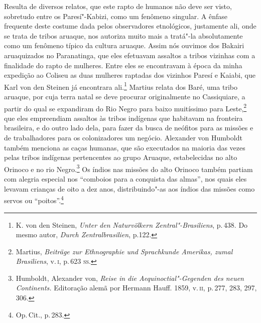 
Resulta de diversos relatos, que este rapto de humanos não deve ser
visto, sobretudo entre os Paresí"-Kabizi, como um fenômeno singular. A
ênfase frequente deste costume dada pelos observadores etnológicos,
justamente ali, onde se trata de tribos aruaque, nos autoriza muito mais
a tratá"-la absolutamente como um fenômeno típico da cultura aruaque.
Assim nós ouvimos dos Bakairi aruaquizados no Paranatinga, que eles
efetuavam assaltos a tribos vizinhas com a finalidade do rapto de
mulheres. Entre eles se encontravam à época da minha expedição ao
Coliseu as duas mulheres raptadas dos vizinhos Paresí e Kaiabi, que Karl
von den Steinen já encontrara ali.\footnote{K. von den Steinen,
  \textit{Unter den Naturvölkern Zentral"-Brasiliens}, p.\,438. Do mesmo
  autor, \textit{Durch Zentralbrasilien}, p.122.} Martius relata dos
Baré, uma tribo aruaque, por cuja terra natal se deve procurar
originalmente no Cassiquiare, a partir do qual se expandiram do Rio
Negro para baixo muitíssimo para Leste,\footnote{Martius, \textit{Beiträge
  zur Ethnographie und Sprachkunde Amerikas, zumal Brasiliens}, v.\,\textsc{i},
  p.\,623 \textsc{ss}.} que eles empreendiam assaltos às tribos indígenas que
habitavam na fronteira brasileira, e do outro lado dela, para fazer da
busca de neófitos para as missões e de trabalhadores para os
colonizadores um negócio. Alexander von Humboldt também menciona as
caças humanas, que são executados na maioria das vezes pelas tribos
indígenas pertencentes ao grupo Aruaque, estabelecidas no alto Orinoco e
no rio Negro.\footnote{Humboldt, Alexander von, \textit{Reise in die
  Aequinoctial"-Gegenden des neuen Continents.} Editoração alemã por
  Hermann Hauff. 1859, v.\,\textsc{ii}, p.\,277, 283, 297, 306.} Os índios nas
missões do alto Orinoco também partiam com alegria especial nos
``comboios para a conquista das almas'', nos quais eles levavam
crianças de oito a dez anos, distribuindo"-as aos índios das missões como
servos ou ``poitos''.\footnote{Op.\,Cit., p.\,283.}

